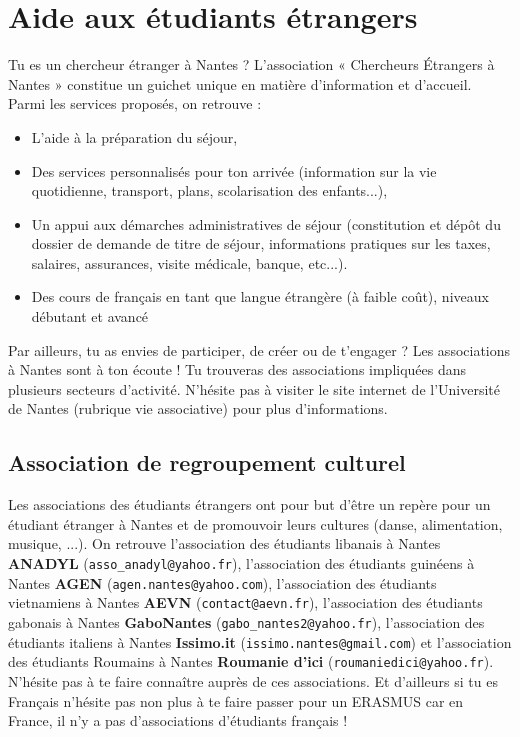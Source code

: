\section{Aide aux étudiants étrangers}\trad
Tu es un chercheur étranger à Nantes ?
L'association « Chercheurs Étrangers à Nantes » constitue un guichet unique en matière d'information et d'accueil.
Parmi les services proposés, on retrouve :
\begin{itemize}
  \item L'aide à la préparation du séjour,
  \item Des services personnalisés pour ton arrivée (information sur la vie quotidienne, transport, plans, scolarisation des enfants...),
  \item Un appui aux démarches administratives de séjour (constitution et dépôt du dossier de demande de titre de séjour, informations pratiques sur les taxes, salaires, assurances, visite médicale, banque, etc...).
  \item Des cours de français en tant que langue étrangère (à faible coût), niveaux débutant et avancé
\end{itemize}

Par ailleurs, tu as envies de participer, de créer ou de t'engager ?
Les associations à Nantes sont à ton écoute !
Tu trouveras des associations impliquées dans plusieurs secteurs d'activité.
N'hésite pas à visiter le site internet de l'Université de Nantes (rubrique vie associative) pour plus d'informations.

\subsection{Association de regroupement culturel}
Les associations des étudiants étrangers ont pour but d'être un repère pour un étudiant étranger à Nantes et de promouvoir leurs cultures (danse, alimentation, musique, ...).
On retrouve l'association des étudiants libanais à Nantes \textbf{ANADYL} (\texttt{asso\_anadyl@yahoo.fr}), l'association des étudiants guinéens à Nantes \textbf{AGEN} (\texttt{agen.nantes@yahoo.com}), l'association des étudiants vietnamiens à Nantes \textbf{AEVN} (\texttt{contact@aevn.fr}), l'association des étudiants gabonais à Nantes \textbf{GaboNantes} (\texttt{gabo\_nantes2@yahoo.fr}), l'association des étudiants italiens à Nantes \textbf{Issimo.it} (\texttt{issimo.nantes@gmail.com}) et l'association des étudiants Roumains à Nantes \textbf{Roumanie d'ici} (\texttt{roumaniedici@yahoo.fr}).
N'hésite pas à te faire connaître auprès de ces associations.
Et d'ailleurs si tu es Français n'hésite pas non plus à te faire passer pour un ERASMUS car en France, il n'y a pas d'associations d'étudiants français !
